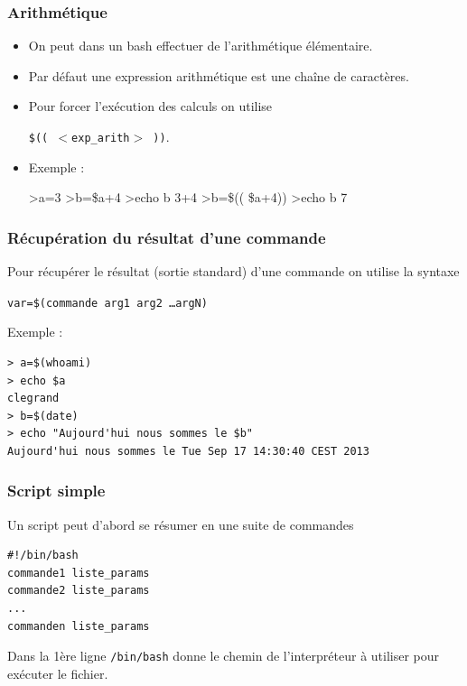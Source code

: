 \documentclass{beamer}
\newenvironment{terminal}{\color{white}\begin{snugshade*}}
{\end{snugshade*}\color{black}}
\begin{document}
\begin{frame}[fragile]
\frametitle{Arithmétique}
\begin{itemize}
\item On peut dans un bash effectuer de l'arithmétique élémentaire.
\item Par défaut une expression arithmétique est une chaîne de caractères.
\item Pour forcer l'exécution des calculs on utilise
\begin{center}
\texttt{\$(( $<$exp\_arith$>$ ))}.
\end{center}
\item Exemple :
\begin{terminal}
\begin{semiverbatim}
>a=3
>b=\$a+4
>echo b
3+4
>b=\$(( \$a+4))
>echo b
7
\end{semiverbatim}
\end{terminal}
\end{itemize}
\end{frame}

\begin{frame}[fragile]
\frametitle{Récupération du résultat d'une commande}

Pour récupérer le résultat (sortie standard) d'une commande on utilise la syntaxe
\begin{center}
\texttt{var=\$(commande arg1 arg2 \ldots argN)}
\end{center}

{\color{blue} Exemple :}
\begin{terminal}
\begin{verbatim}
> a=$(whoami)
> echo $a
clegrand
> b=$(date)
> echo "Aujourd'hui nous sommes le $b"
Aujourd'hui nous sommes le Tue Sep 17 14:30:40 CEST 2013
\end{verbatim}
\end{terminal}
\end{frame}



\begin{frame}[fragile]

\frametitle{Script simple}
Un script peut d'abord se résumer en une suite de commandes

\begin{block}{}

\begin{verbatim}
#!/bin/bash
commande1 liste_params
commande2 liste_params
...
commanden liste_params
\end{verbatim}

\end{block}
Dans la 1ère ligne \verb|/bin/bash| donne le chemin de l'interpréteur à utiliser pour exécuter le fichier.
\end{frame}
\end{document}
